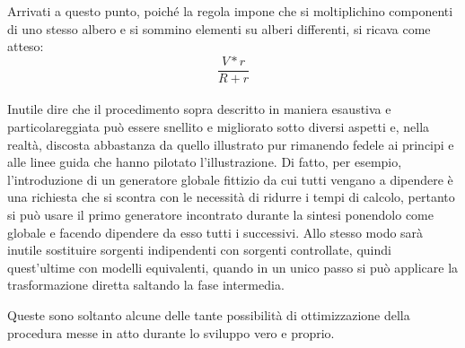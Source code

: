 Arrivati a questo punto, poiché la regola impone che si moltiplichino componenti di uno stesso albero e si sommino elementi su alberi differenti, si ricava come atteso:
$$ \frac{V * r}{R + r} $$

\paragraph{}

Inutile dire che il procedimento sopra descritto in maniera esaustiva e particolareggiata può essere snellito e migliorato sotto diversi aspetti e, nella realtà, discosta abbastanza da quello illustrato pur rimanendo fedele ai principi e alle linee guida che hanno pilotato l'illustrazione. Di fatto, per esempio, l'introduzione di un generatore globale fittizio da cui tutti vengano a dipendere è una richiesta che si scontra con le necessità di ridurre i tempi di calcolo, pertanto si può usare il primo generatore incontrato durante la sintesi ponendolo come globale e facendo dipendere da esso tutti i successivi. Allo stesso modo sarà inutile sostituire sorgenti indipendenti con sorgenti controllate, quindi quest'ultime con modelli equivalenti, quando in un unico passo si può applicare la trasformazione diretta saltando la fase intermedia.

Queste sono soltanto alcune delle tante possibilità di ottimizzazione della procedura messe in atto durante lo sviluppo vero e proprio.
